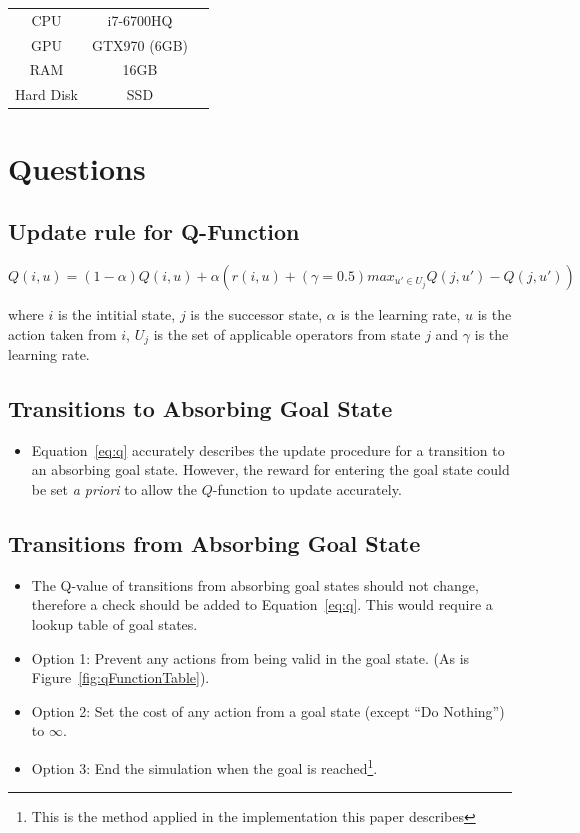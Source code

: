 \documentclass{article}
\begin{document}
\begin{tabular}{ |c|c|c| } 
 \hline
 CPU & i7-6700HQ \\ 
 GPU & GTX970 (6GB) \\ 
 RAM & 16GB \\ 
 Hard Disk & SSD\\
 \hline
\end{tabular}

\newpage

\section{Questions}
\subsection{Update rule for Q-Function}
\begin{equation}
\label{eq:q}
Q(i,u)=(1-\alpha)Q(i,u)+\alpha \left( r(i,u) + (\gamma=0.5) {max}_{u' \in U_j}  Q(j,u')-Q(j,u')\right)
\end{equation}

where $i$ is the intitial state, $j$ is the successor state, $\alpha$ is the learning rate, $u$ is the action taken from $i$, $U_j$ is the set of applicable operators from state $j$ and $\gamma$ is the learning rate. 


\subsection{Transitions to Absorbing Goal State}
\begin{itemize}
\item Equation~\ref{eq:q} accurately describes the update procedure for a transition to an absorbing goal state. However, the reward for entering the goal state could be set \textit{a priori} to allow the $Q$-function to update accurately.
\end{itemize}

\subsection{Transitions from Absorbing Goal State}
\begin{itemize}
\item The Q-value of transitions from absorbing goal states should not change, therefore a check should be added to Equation~\ref{eq:q}. This would require a lookup table of goal states.
\item Option 1: Prevent any actions from being valid in the goal state. (As is Figure~\ref{fig:qFunctionTable}).
\item Option 2: Set the cost of any action from a goal state (except ``Do Nothing'') to $\infty$.
\item Option 3: End the simulation when the goal is reached\footnote{This is the method applied in the implementation this paper describes}.
\end{itemize}
\end{document}
